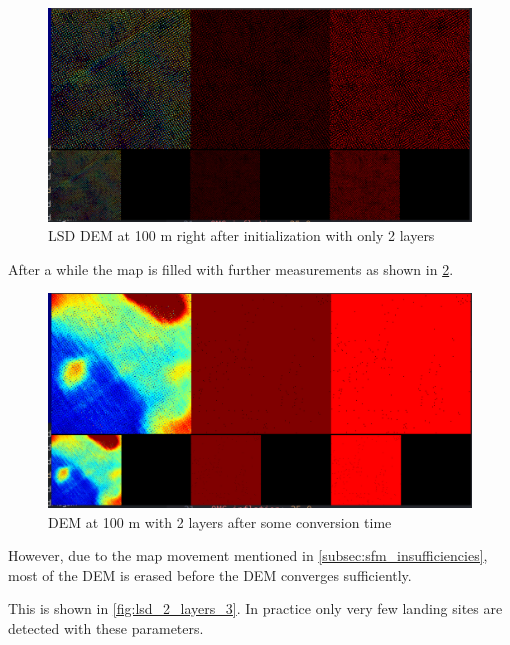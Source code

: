 \begin{figure}[h]
\centering
\includegraphics[scale=0.24]{images/evaluation/LSD_layer_analysis/2_layers_1.png}
\caption{LSD DEM at 100 m right after initialization with only 2 layers}
\label{fig:lsd_2_layers_1}
\end{figure}

After a while the map is filled with further measurements as shown in \cref{fig:lsd_2_layers_2}.

\begin{figure}[h]
\centering
\includegraphics[scale=0.24]{images/evaluation/LSD_layer_analysis/2_layers_2.png}
\caption{DEM at 100 m with 2 layers after some conversion time}
\label{fig:lsd_2_layers_2}
\end{figure}

However, due to the map movement mentioned in \cref{subsec:sfm_insufficiencies}, most of the DEM is erased before the DEM converges sufficiently. 

This is shown in \cref{fig:lsd_2_layers_3}. In practice only very few landing sites are detected with these parameters. 

